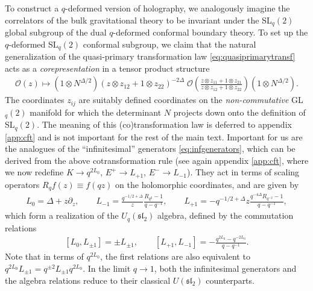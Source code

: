 \documentclass[a4paper,titlepage,12pt]{article}
\numberwithin{equation}{section}
\begin{document}
To construct a $q$-deformed version of holography, we analogously imagine the correlators of the bulk gravitational theory to be invariant under the SL$_q(2)$ global subgroup of the dual $q$-deformed conformal boundary theory. To set up the $q$-deformed SL$_q(2)$ conformal subgroup, we claim that the natural generalization of the quasi-primary transformation law \eqref{eq:quasiprimarytransf} acts as a \emph{corepresentation} in a tensor product structure 
\begin{align}\label{eq:corep}
    \mathcal{O}(z) \mapsto  (1\otimes N^{\Delta/2}) \left( z\otimes z_{12} + 1\otimes z_{22} \right)^{-2\Delta} \;\mathcal{O}\left( \frac{z\otimes z_{11} + 1\otimes z_{21}}{ z\otimes z_{12} +1\otimes z_{22}}\right) (1\otimes N^{\Delta/2}).
\end{align}
The coordinates $z_{ij}$ are suitably defined coordinates on the \emph{non-commutative} GL$_q(2)$ manifold for which the determinant $N$ projects down onto the definition of SL$_q(2)$. The meaning of this (co)transformation law is deferred to appendix \ref{app:cft} and is not important for the rest of the main text. Important for us are the analogues of the ``infinitesimal'' generators \eqref{eq:infgenerators}, which can be derived from the above cotransformation rule (see again appendix \ref{app:cft}, where we now redefine $K\rightarrow q^{2L_0}$, $E^+\rightarrow L_{+1}$, $E^-\rightarrow L_{-1}$). They act in terms of scaling operators  $R_qf(z)\equiv f(qz)$ on the holomorphic coordinates, and are given by 
\begin{align}
\label{eq:qprincipalgenerators2}
     L_0=\Delta +z\partial_z, \qquad L_{-1}=\frac{q^{-1/2+\Delta}}{z}\frac{R_{q^2}-1}{q-q^{-1}}, \qquad L_{+1}=-q^{-1/2+\Delta} z\frac{q^{-4\Delta} R_{q^{-2}}-1}{q-q^{-1}},
\end{align} 
which form a realization of the $U_q(\mathfrak{sl}_2)$ algebra, defined by the commutation relations 
\begin{align}
\label{eq:qalgebra}
    [L_0,L_{\pm1}]=\pm L_{\pm1}, \qquad [L_{+1},L_{-1}]=-\frac{q^{2L_0}-q^{-2L_0}}{q-q^{-1}}.
\end{align}
Note that in terms of $q^{2L_0}$, the first relations are also equivalent to $q^{2L_0}L_{\pm1}=q^{\pm2}L_{\pm1}q^{2L_0}$. In the limit $q\rightarrow1$, both the infinitesimal generators and the algebra relations reduce to their classical $U(\mathfrak{sl}_2)$ counterparts.
\end{document}
